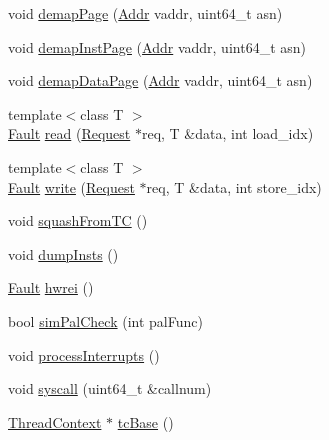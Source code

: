 \begin{DoxyCompactItemize}
\item 
void \hyperlink{classOzoneCPU_a2d698ff909513b48a1263f8a5440e067}{demapPage} (\hyperlink{base_2types_8hh_af1bb03d6a4ee096394a6749f0a169232}{Addr} vaddr, uint64\_\-t asn)
\item 
void \hyperlink{classOzoneCPU_ac8a36d45a839b07f50b73f1eee119615}{demapInstPage} (\hyperlink{base_2types_8hh_af1bb03d6a4ee096394a6749f0a169232}{Addr} vaddr, uint64\_\-t asn)
\item 
void \hyperlink{classOzoneCPU_a26789603cc94992d18f8ddedfff96acf}{demapDataPage} (\hyperlink{base_2types_8hh_af1bb03d6a4ee096394a6749f0a169232}{Addr} vaddr, uint64\_\-t asn)
\item 
{\footnotesize template$<$class T $>$ }\\\hyperlink{classRefCountingPtr}{Fault} \hyperlink{classOzoneCPU_a114fc97babb72af291378f2d42f0b445}{read} (\hyperlink{classRequest}{Request} $\ast$req, T \&data, int load\_\-idx)
\item 
{\footnotesize template$<$class T $>$ }\\\hyperlink{classRefCountingPtr}{Fault} \hyperlink{classOzoneCPU_aa934cdc9883884b14ba62daa03c2c171}{write} (\hyperlink{classRequest}{Request} $\ast$req, T \&data, int store\_\-idx)
\item 
void \hyperlink{classOzoneCPU_a24cd8db837a73b879041bf33da7b2064}{squashFromTC} ()
\item 
void \hyperlink{classOzoneCPU_a80587b4fe043bbe1995536cb3b361588}{dumpInsts} ()
\item 
\hyperlink{classRefCountingPtr}{Fault} \hyperlink{classOzoneCPU_a5f42e07ae335dff417664e91518c7f1e}{hwrei} ()
\item 
bool \hyperlink{classOzoneCPU_a461205960be9d52e9beda48a77e9c600}{simPalCheck} (int palFunc)
\item 
void \hyperlink{classOzoneCPU_a45387b6e4a00dd0948cb94c3abfa06f3}{processInterrupts} ()
\item 
void \hyperlink{classOzoneCPU_afb9b1cbbf52b94f9a2da780a3cc4586b}{syscall} (uint64\_\-t \&callnum)
\item 
\hyperlink{classThreadContext}{ThreadContext} $\ast$ \hyperlink{classOzoneCPU_ad33756f3e96ee445dca8d69b1dd8709c}{tcBase} ()
\end{DoxyCompactItemize}
